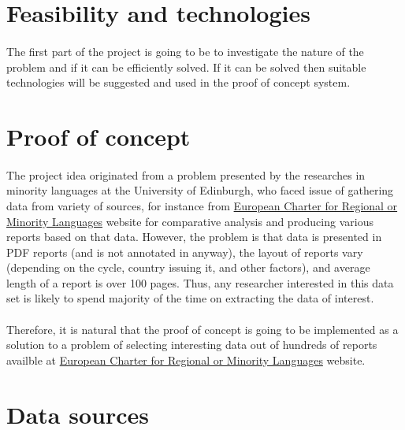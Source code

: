 \documentclass[11pt, a4paper]{report}
\begin{document}
\section{Feasibility and technologies}
\paragraph{}
The first part of the project is going to be to investigate the nature of the problem and if it can be efficiently solved. If it can be solved then suitable technologies will be suggested and used in the proof of concept system.

\section{Proof of concept}
\paragraph{}
The project idea originated from a problem presented by the researches in minority languages at the University of Edinburgh, who faced issue of gathering data from variety of sources, for instance from \href{http://www.coe.int/t/dg4/education/minlang/Report/default_en.asp}{European Charter for Regional or Minority Languages} website for comparative analysis and producing various reports based on that data. However, the problem is that data is presented in PDF reports (and is not annotated in anyway), the layout of reports vary (depending on the cycle, country issuing it, and other factors), and average length of a report is over 100 pages. Thus, any researcher interested in this data set is likely to spend majority of the time on extracting the data of interest.

\paragraph{}
Therefore, it is natural that the proof of concept is going to be implemented as a solution to a problem of selecting interesting data out of hundreds of reports availble at \href{http://www.coe.int/t/dg4/education/minlang/Report/default_en.asp}{European Charter for Regional or Minority Languages} website.

\section{Data sources}
\end{document}

